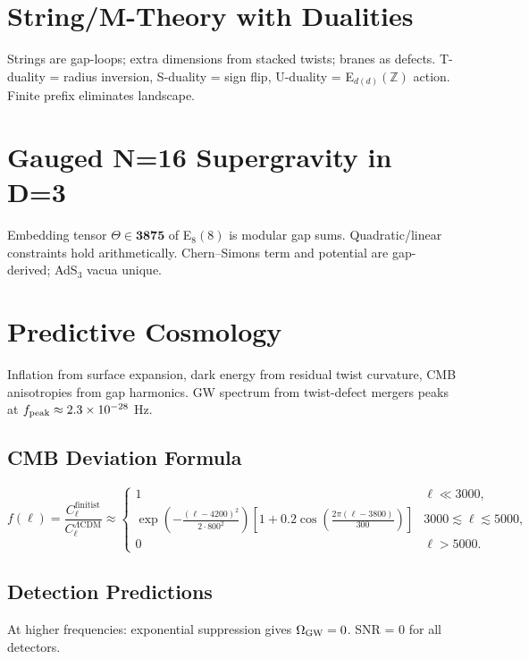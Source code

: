 \documentclass[11pt]{article}
\begin{document}
\section{String/M-Theory with Dualities}
Strings are gap-loops; extra dimensions from stacked twists; branes as defects. T-duality = radius inversion, S-duality = sign flip, U-duality = E\(_{d(d)}(\mathbb{Z})\) action. Finite prefix eliminates landscape.

\section{Gauged N=16 Supergravity in D=3}
Embedding tensor \(\Theta \in \mathbf{3875}\) of E\(_8(8)\) is modular gap sums. Quadratic/linear constraints hold arithmetically. Chern–Simons term and potential are gap-derived; AdS\(_3\) vacua unique.

\section{Predictive Cosmology}
Inflation from surface expansion, dark energy from residual twist curvature, CMB anisotropies from gap harmonics. GW spectrum from twist-defect mergers peaks at \(f_{\rm peak} \approx 2.3 \times 10^{-28}\) Hz.

\subsection{CMB Deviation Formula}
\[
f(\ell) = \frac{C_\ell^{\text{finitist}}}{C_\ell^{\Lambda\text{CDM}}} \approx
\begin{cases}
1 & \ell \ll 3000, \\
\exp\left( -\frac{(\ell - 4200)^2}{2 \cdot 800^2} \right) \left[ 1 + 0.2 \cos\left( \frac{2\pi (\ell - 3800)}{300} \right) \right] & 3000 \lesssim \ell \lesssim 5000, \\
0 & \ell > 5000.
\end{cases}
\]

\subsection{Detection Predictions}
At higher frequencies: exponential suppression gives \(\Omega_{\rm GW} = 0\). SNR = 0 for all detectors.
\end{document}
